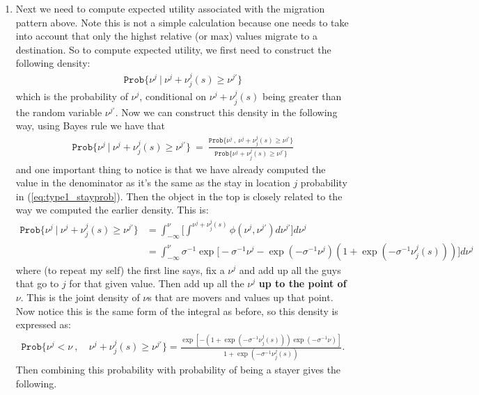 \documentclass[pdftex,11pt]{article}
\begin{document}
\begin{enumerate}
\item Next we need to compute expected utility associated with the migration pattern above. Note this is not a simple calculation because one needs to take into account that only the highst relative (or max) values migrate to a destination. So to compute expected utility, we first need to construct the following density:
\begin{align}
\mathtt{Prob}\{ \nu^{j} \ | \ \nu^{j} + \nu_j^{j}(s) \geq \nu^{j'} \}
\end{align}
which is the probability of $\nu^{j}$, conditional on $\nu^{j} + \nu_j^{j}(s)$ being greater than the random variable $\nu^{j'}$. Now we can construct this density in the following way, using Bayes rule we have that
\begin{align}
\mathtt{Prob}\{ \nu^{j} \ | \ \nu^{j} + \nu_j^{j}(s) \geq \nu^{j'} \} \  = \  \frac{\mathtt{Prob}\{ \nu^{j} \ , \ \nu^{j} + \nu_j^{j}(s) \geq \nu^{j'} \}}{\mathtt{Prob}\{ \nu^{j} + \nu_j^{j}(s) \geq \nu^{j'} \}}
\end{align}
and one important thing to notice is that we have already computed the value in the denominator as it's the same as the stay in location $j$ probability in (\ref{eq:type1_stayprob}). Then the object in the top is closely related to the way we computed the earlier density. This is:
\begin{align}
\mathtt{Prob}\{ \nu^{j} \ | \ \nu^{j} + \nu_j^{j}(s) \geq \nu^{j'} \}  & = \int_{-\infty}^{\nu} \bigg [ \int^{\nu^{j} + \nu_j^{j}(s)} \phi(\nu^{j},\nu^{j'})d\nu^{j'} \bigg ] d\nu^{j} \\
& = \int_{-\infty}^{\nu}\sigma^{-1}\exp \big [-\sigma^{-1}\nu^{j} - \exp(-\sigma^{-1}\nu^{j})(1 +
\exp(-\sigma^{-1}\nu_j^{j}(s))) \big]d\nu^{j}
\end{align}
where (to repeat my self) the first line says, fix a $\nu^{j}$ and add up all the guys that go to $j$ for that given value. Then add up all the $\nu^{j}$ \textbf{up to the point of} $\nu$. This is the joint density of $\nu$s that are movers and values up that point. Now notice this is the same form of the integral as before, so this density is expressed as:
\begin{align}
\mathtt{Prob}\{ \nu^{j} < \nu \ , &\ \nu^{j} + \nu_j^{j}(s) \geq \nu^{j'} \}  = \frac{\exp[-(1+\exp(-\sigma^{-1}\nu_j^{j}(s)))\exp(-\sigma^{-1}\nu)]}{1+\exp(-\sigma^{-1}\nu_j^{j}(s))}.
\end{align}
Then combining this probability with probability of being a stayer gives the following.
\begin{align}

\end{align}
\end{enumerate}
\end{document}
